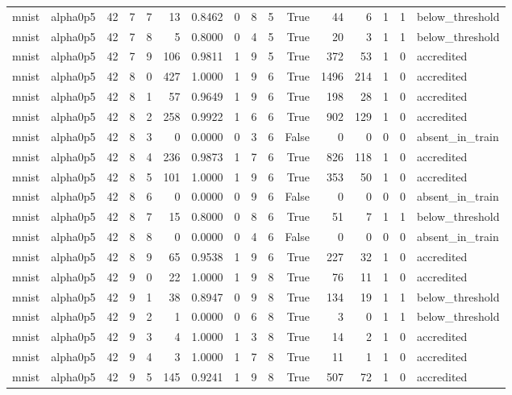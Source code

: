 \begin{tabular}{llrrrrrrrrrrrrrl}
mnist & alpha0p5 & 42 & 7 & 7 & 13 & 0.8462 & 0 & 8 & 5 & True & 44 & 6 & 1 & 1 & below\_threshold \\
mnist & alpha0p5 & 42 & 7 & 8 & 5 & 0.8000 & 0 & 4 & 5 & True & 20 & 3 & 1 & 1 & below\_threshold \\
mnist & alpha0p5 & 42 & 7 & 9 & 106 & 0.9811 & 1 & 9 & 5 & True & 372 & 53 & 1 & 0 & accredited \\
mnist & alpha0p5 & 42 & 8 & 0 & 427 & 1.0000 & 1 & 9 & 6 & True & 1496 & 214 & 1 & 0 & accredited \\
mnist & alpha0p5 & 42 & 8 & 1 & 57 & 0.9649 & 1 & 9 & 6 & True & 198 & 28 & 1 & 0 & accredited \\
mnist & alpha0p5 & 42 & 8 & 2 & 258 & 0.9922 & 1 & 6 & 6 & True & 902 & 129 & 1 & 0 & accredited \\
mnist & alpha0p5 & 42 & 8 & 3 & 0 & 0.0000 & 0 & 3 & 6 & False & 0 & 0 & 0 & 0 & absent\_in\_train \\
mnist & alpha0p5 & 42 & 8 & 4 & 236 & 0.9873 & 1 & 7 & 6 & True & 826 & 118 & 1 & 0 & accredited \\
mnist & alpha0p5 & 42 & 8 & 5 & 101 & 1.0000 & 1 & 9 & 6 & True & 353 & 50 & 1 & 0 & accredited \\
mnist & alpha0p5 & 42 & 8 & 6 & 0 & 0.0000 & 0 & 9 & 6 & False & 0 & 0 & 0 & 0 & absent\_in\_train \\
mnist & alpha0p5 & 42 & 8 & 7 & 15 & 0.8000 & 0 & 8 & 6 & True & 51 & 7 & 1 & 1 & below\_threshold \\
mnist & alpha0p5 & 42 & 8 & 8 & 0 & 0.0000 & 0 & 4 & 6 & False & 0 & 0 & 0 & 0 & absent\_in\_train \\
mnist & alpha0p5 & 42 & 8 & 9 & 65 & 0.9538 & 1 & 9 & 6 & True & 227 & 32 & 1 & 0 & accredited \\
mnist & alpha0p5 & 42 & 9 & 0 & 22 & 1.0000 & 1 & 9 & 8 & True & 76 & 11 & 1 & 0 & accredited \\
mnist & alpha0p5 & 42 & 9 & 1 & 38 & 0.8947 & 0 & 9 & 8 & True & 134 & 19 & 1 & 1 & below\_threshold \\
mnist & alpha0p5 & 42 & 9 & 2 & 1 & 0.0000 & 0 & 6 & 8 & True & 3 & 0 & 1 & 1 & below\_threshold \\
mnist & alpha0p5 & 42 & 9 & 3 & 4 & 1.0000 & 1 & 3 & 8 & True & 14 & 2 & 1 & 0 & accredited \\
mnist & alpha0p5 & 42 & 9 & 4 & 3 & 1.0000 & 1 & 7 & 8 & True & 11 & 1 & 1 & 0 & accredited \\
mnist & alpha0p5 & 42 & 9 & 5 & 145 & 0.9241 & 1 & 9 & 8 & True & 507 & 72 & 1 & 0 & accredited \\

\end{tabular}
